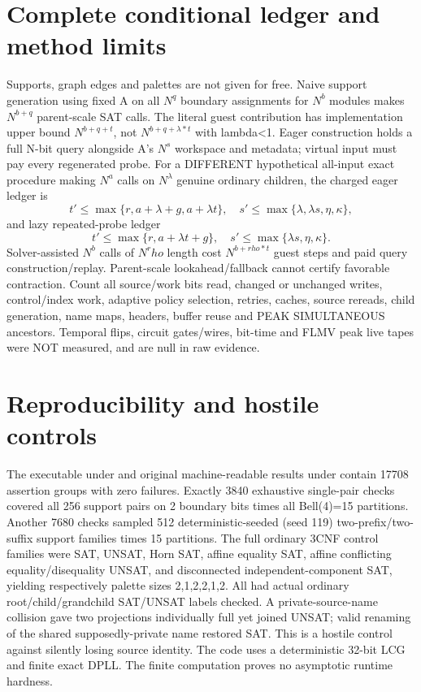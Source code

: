 \documentclass[11pt]{article}
\begin{document}
\section{Complete conditional ledger and method limits}
Supports, graph edges and palettes are not given for free. Naive support generation using fixed A on all \(N^q\) boundary assignments for \(N^b\) modules makes \(N^{b+q}\) parent-scale SAT calls. The literal guest contribution has implementation upper bound \(N^{b+q+t}\), not \(N^{b+q+\lambda*t}\) with lambda<1. Eager construction holds a full N-bit query alongside A's \(N^s\) workspace and metadata; virtual input must pay every regenerated probe.
For a DIFFERENT hypothetical all-input exact procedure making \(N^a\) calls on \(N^\lambda\) genuine ordinary children, the charged eager ledger is
\[
t'\le\max\{r,a+\lambda+g,a+\lambda t\},\quad s'\le\max\{\lambda,\lambda s,\eta,\kappa\},
\]
and lazy repeated-probe ledger
\[
t'\le\max\{r,a+\lambda t+g\},\quad s'\le\max\{\lambda s,\eta,\kappa\}.
\]
Solver-assisted \(N^b\) calls of \(N^rho\) length cost \(N^{b+rho*t}\) guest steps and paid query construction/replay. Parent-scale lookahead/fallback cannot certify favorable contraction. Count all source/work bits read, changed or unchanged writes, control/index work, adaptive policy selection, retries, caches, source rereads, child generation, name maps, headers, buffer reuse and PEAK SIMULTANEOUS ancestors. Temporal flips, circuit gates/wires, bit-time and FLMV peak live tapes were NOT measured, and are null in raw evidence.
\section{Reproducibility and hostile controls}
The executable under  and original machine-readable results under  contain 17708 assertion groups with zero failures.
Exactly 3840 exhaustive single-pair checks covered all 256 support pairs on 2 boundary bits times all Bell(4)=15 partitions. Another 7680 checks sampled 512 deterministic-seeded (seed 119) two-prefix/two-suffix support families times 15 partitions. The full ordinary 3CNF control families were SAT, UNSAT, Horn SAT, affine equality SAT, affine conflicting equality/disequality UNSAT, and disconnected independent-component SAT, yielding respectively palette sizes 2,1,2,2,1,2. All had actual ordinary root/child/grandchild SAT/UNSAT labels checked. A private-source-name collision gave two projections individually full yet joined UNSAT; valid renaming of the shared supposedly-private name restored SAT. This is a hostile control against silently losing source identity.
The code uses a deterministic 32-bit LCG and finite exact DPLL. The finite computation proves no asymptotic runtime hardness.
\end{document}
